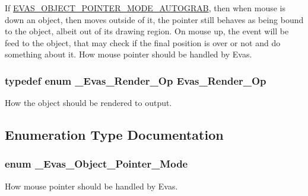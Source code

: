 If \hyperlink{group__Evas__Object__Group__Extras_gga822b2a69896ff21279debe2a417e3082a088ef2950aeb5a105c53decbbac82a28}{EVAS\_\-OBJECT\_\-POINTER\_\-MODE\_\-AUTOGRAB}, then when mouse is down an object, then moves outside of it, the pointer still behaves as being bound to the object, albeit out of its drawing region. On mouse up, the event will be feed to the object, that may check if the final position is over or not and do something about it. How mouse pointer should be handled by Evas. 
\subsubsection[{Evas\_\-Render\_\-Op}]{\setlength{\rightskip}{0pt plus 5cm}typedef enum {\bf \_\-Evas\_\-Render\_\-Op}  {\bf Evas\_\-Render\_\-Op}}\label{group__Evas__Object__Group__Extras_ga9c39a3ca795bbec3687fae9ee67d6056}
How the object should be rendered to output. 

\subsection{Enumeration Type Documentation}
\subsubsection[{\_\-Evas\_\-Object\_\-Pointer\_\-Mode}]{\setlength{\rightskip}{0pt plus 5cm}enum {\bf \_\-Evas\_\-Object\_\-Pointer\_\-Mode}}\label{group__Evas__Object__Group__Extras_ga822b2a69896ff21279debe2a417e3082}


How mouse pointer should be handled by Evas. 

